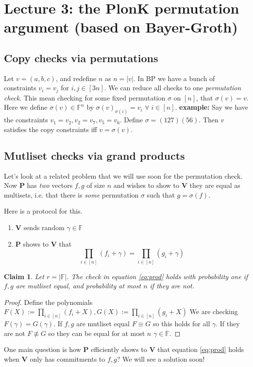 \documentclass[11pt]{article} %
\newcommand{\F}{\ensuremath{\mathbb F}\xspace}
\newcommand{\defeq}{:=}
\newcommand{\prv}{\ensuremath{\mathsf{\mathbf{P}}}\xspace}
\newcommand{\ver}{\ensuremath{\mathsf{\mathbf{V}}}\xspace}
\newtheorem{claim}[lemma]{Claim}
\newcommand{\prog}{\ensuremath{\mathrm{BP}}\xspace}
\begin{document}
\section{Lecture 3: the PlonK permutation argument (based on Bayer-Groth)}
\subsection{Copy checks via permutations}
Let $v=(a,b,c)$, and redefine $n$ as $n=|v|$. In \prog we have a bunch of constraints $v_i=v_j$ for $i,j \in [3n]$.
We can reduce all checks to one \emph{permutation check}.
This mean checking for some fixed permutation $\sigma$ on $[n]$, that $\sigma(v)=v$.
Here we define $\sigma(v)\in \F^n$ by $\sigma(v)_{\sigma(i)} =v_i$ $\forall\; i\in [n]$.
\textbf{example:}
Say we have the constraints $v_1=v_2, v_2=v_7, v_5=v_6$.
Define $\sigma= (127)(56)$.
Then $v$ satisfies the copy constraints iff $v=\sigma(v)$.


\subsection{Mutliset checks via grand products}
Let's look at a related problem that we will use soon for the permutation check.
Now \prv has  \emph{two} vectors $f,g$ of size $n$ and wishes to show to \ver they are equal as multisets,
i.e. that there is \emph{some} permutation $\sigma$ such that $g=\sigma(f)$.

Here is a protocol for this.
\begin{enumerate}
 \item \ver sends random $\gamma\in \F$
 \item \prv shows to \ver  that 
 \[\prod_{i\in [n]} (f_i+\gamma) = \prod_{i\in [n]}(g_i+\gamma)\]\label{eq:prod}
\end{enumerate}
\begin{claim}
Let $r=|\F|$.
 The check in equation \ref{eq:prod} holds with probability one if $f,g$ are mutliset equal,
 and probability at most $n$ if they are not.
\end{claim}
\begin{proof}
Define the polynomials 
$F(X)\defeq \prod_{i\in [n]} (f_i+X),G(X)\defeq \prod_{i\in [n]} (g_i+X)$
We are checking $F(\gamma)=G(\gamma)$. If $f,g$ are mutliset equal $F\equiv G$ so this holds for all $\gamma$.
If they are not $F\not\equiv G$ so they can be equal for at most $n$ $\gamma\in \F$.
\end{proof}


One main question is how \prv efficiently shows to \ver that equation \ref{eq:prod} holds when \ver only 
has commitments to $f,g$? We will see a solution soon!
\end{document}
